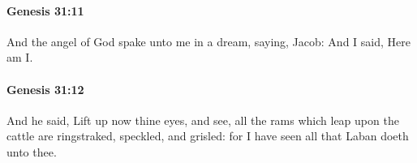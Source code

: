 		\paragraph{Genesis 31:11} %
			\label{GENESIS-31-11}

			And the angel of God spake unto me in a dream, saying, Jacob: And I said, Here am I.


		\paragraph{Genesis 31:12} %
			\label{GENESIS-31-12}

			And he said, Lift up now thine eyes, and see, all the rams which leap upon the cattle are ringstraked, speckled, and grisled: for I have seen all that Laban doeth unto thee.


